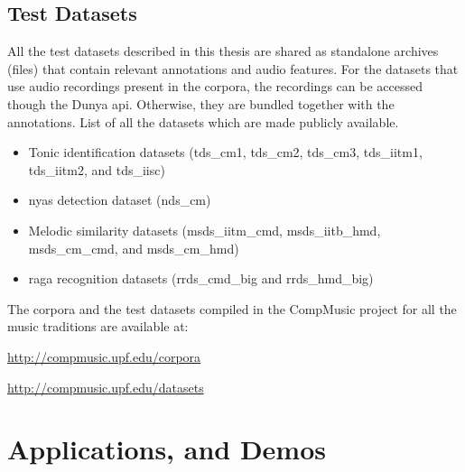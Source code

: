 \subsection*{Test Datasets}

All the test datasets described in this thesis are shared as standalone archives (files) that contain relevant annotations and audio features. For the datasets that use audio recordings present in the corpora, the recordings can be accessed though the Dunya \acrshort{api}. Otherwise, they are bundled together with the annotations. List of all the datasets which are made publicly available.
\begin{itemize}
	\item Tonic identification datasets (\acrshort{tds_cm1}, \acrshort{tds_cm2}, \acrshort{tds_cm3}, \acrshort{tds_iitm1}, \acrshort{tds_iitm2}, and \acrshort{tds_iisc})
	\item \Gls{nyas} detection dataset (\acrshort{nds_cm})
	\item Melodic similarity datasets (\acrshort{msds_iitm_cmd}, \acrshort{msds_iitb_hmd}, \acrshort{msds_cm_cmd}, and \acrshort{msds_cm_hmd})
	\item \Gls{raga} recognition datasets (\acrshort{rrds_cmd_big} and \acrshort{rrds_hmd_big})
\end{itemize}

The corpora and the test datasets compiled in the CompMusic project for all the music traditions are available at:
\begin{description}[style=nextline]
	\item[CompMusic music corpora] \url{http://compmusic.upf.edu/corpora}
	\item[CompMusic test datasets] \url{http://compmusic.upf.edu/datasets}
\end{description}


\section*{Applications, and Demos}

